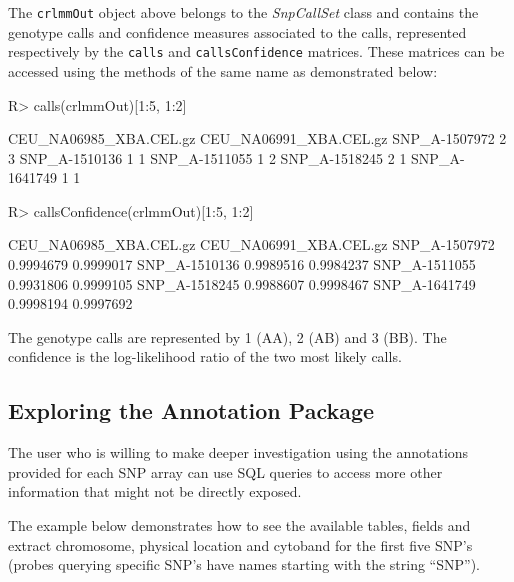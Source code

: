\documentclass{article}
\newcommand{\Robject}[1]{{\texttt{#1}}}
\newcommand{\Rclass}[1]{{\textit{#1}}}
\begin{document}
The \Robject{crlmmOut} object above belongs to the \Rclass{SnpCallSet}
class and contains the genotype calls and confidence measures
associated to the calls, represented respectively by the
\Robject{calls} and \Robject{callsConfidence} matrices. These matrices
can be accessed using the methods of the same name as demonstrated
below:

\begin{Schunk}
\begin{Sinput}
R> calls(crlmmOut)[1:5, 1:2]
\end{Sinput}
\begin{Soutput}
              CEU_NA06985_XBA.CEL.gz CEU_NA06991_XBA.CEL.gz
SNP_A-1507972                      2                      3
SNP_A-1510136                      1                      1
SNP_A-1511055                      1                      2
SNP_A-1518245                      2                      1
SNP_A-1641749                      1                      1
\end{Soutput}
\begin{Sinput}
R> callsConfidence(crlmmOut)[1:5, 1:2]
\end{Sinput}
\begin{Soutput}
              CEU_NA06985_XBA.CEL.gz CEU_NA06991_XBA.CEL.gz
SNP_A-1507972              0.9994679              0.9999017
SNP_A-1510136              0.9989516              0.9984237
SNP_A-1511055              0.9931806              0.9999105
SNP_A-1518245              0.9988607              0.9998467
SNP_A-1641749              0.9998194              0.9997692
\end{Soutput}
\end{Schunk}

The genotype calls are represented by 1 (AA), 2 (AB) and 3 (BB). The
confidence is the log-likelihood ratio of the two most likely calls.

\subsection{Exploring the Annotation Package}

The user who is willing to make deeper investigation using the
annotations provided for each SNP array can use SQL queries to access
more other information that might not be directly exposed.

The example below demonstrates how to see the available tables, fields
and extract chromosome, physical location and cytoband for the first
five SNP's (probes querying specific SNP's have names starting with
the string ``SNP'').
\end{document}
